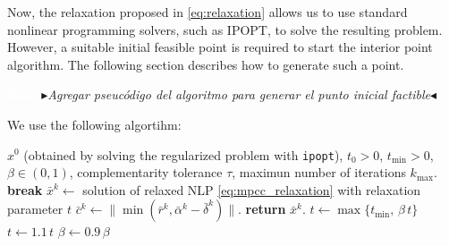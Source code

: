 \documentclass[review,onefignum,onetabnum]{siamonline190516}
\newcommand{\nb}[3]{
		{\colorbox{#2}{\bfseries\sffamily\scriptsize\textcolor{white}{#1}}}
		{\textcolor{#2}{\sf\small$\blacktriangleright$\textit{#3}$\blacktriangleleft$}}}
\newcommand{\dr}[1]{\nb{Dani}{white!30!blue}{#1}}
\begin{document}
Now, the relaxation proposed in \eqref{eq:relaxation} allows us to use standard nonlinear programming solvers, such as IPOPT, to solve the resulting problem. However, a suitable initial feasible point is required to start the interior point algorithm. The following section describes how to generate such a point.

\dr{Agregar pseucódigo del algoritmo para generar el punto inicial factible}

We use the following algortihm:

\begin{algorithm}[H]
\caption{Algorithm for solving MPCC}
\label{alg:mpcc_tvd}
\begin{algorithmic}[1]
\Require $x^0$ (obtained by solving the regularized problem with \texttt{ipopt}), $t_0>0$, $t_{\min}>0$, $\beta\in(0,1)$, complementarity tolerance $\tau$, maximun number of iterations $k_{\max}$.
  \State \textbf{break}
\EndIf
\State $\bar{x}^k \gets$ solution of relaxed NLP \eqref{eq:mpcc_relaxation} with relaxation parameter $t$
\State$\bar{c}^{k} \gets \|\min(\bar{r}^{k}, \bar{\alpha}^{k}-\bar{\delta}^{k})\|.$
   \State \textbf{return} $\bar{x}^{k}$.
\EndIf
{}
   \State $t \gets \max\{t_{\min},\, \beta\, t\}$ 
\Else 
   \State $t \gets 1.1\, t$     
   \State $\beta \gets 0.9\, \beta$
\EndIf
\EndFor
\end{algorithmic}
\end{algorithm}
\end{document}
